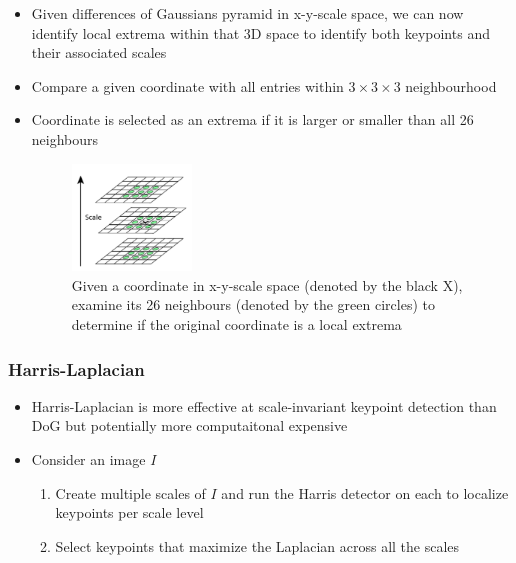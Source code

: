 \documentclass[letterpaper,12pt]{article}
\begin{document}
\begin{itemize}
 \item Given differences of Gaussians pyramid in x-y-scale space, we can now identify local extrema within that 3D space to identify both keypoints and their associated scales
 \item Compare a given coordinate with all entries within $3 \times 3 \times 3$ neighbourhood
 \item Coordinate is selected as an extrema if it is larger or smaller than all 26 neighbours
       \begin{figure}[h]
        \centering
        \includegraphics[width=0.3\textwidth]{images/maxima.png}
        \caption{Given a coordinate in x-y-scale space (denoted by the black X), examine its 26 neighbours (denoted by the green circles) to determine if the original coordinate is a local extrema}
       \end{figure}
\end{itemize}

\subsubsection{Harris-Laplacian}
\begin{itemize}
 \item Harris-Laplacian is more effective at scale-invariant keypoint detection than DoG but potentially more computaitonal expensive
 \item Consider an image $I$
       \begin{enumerate}
        \item Create multiple scales of $I$ and run the Harris detector on each to localize keypoints per scale level
        \item Select keypoints that maximize the Laplacian across all the scales
       \end{enumerate}
\end{itemize}
\end{document}
